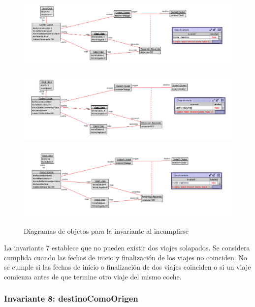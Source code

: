\documentclass[12pt.a4paper]{article}
\begin{document}
  \begin{figure}[H]
    \centering
    \begin{minipage}{0.49\textwidth}
        \centering
        \includegraphics[width=\linewidth]{Soils/7_v2.png}
        \label{fig:diagrama1}
    \end{minipage}
    \hfill
    \begin{minipage}{0.49\textwidth}
        \centering
        \includegraphics[width=\linewidth]{Soils/7_v3.png}
        \label{fig:diagrama2}
    \end{minipage}
    \hfill
        \centering
        \includegraphics[width=0.7\linewidth]{Soils/7_v4.png}
        \label{fig:diagrama3}
    \caption{Diagramas de objetos para la invariante al incumplirse}
    \label{fig:Diagrama_incumplimiento}
\end{figure}

La invariante 7 establece que no pueden existir dos viajes solapados. Se considera cumplida cuando las fechas de inicio y finalización de los viajes no coinciden. No se cumple si las fechas de inicio o finalización de dos viajes coinciden o si un viaje comienza antes de que termine otro viaje del mismo coche.

\subsubsection{Invariante 8: destinoComoOrigen}
\end{document}
